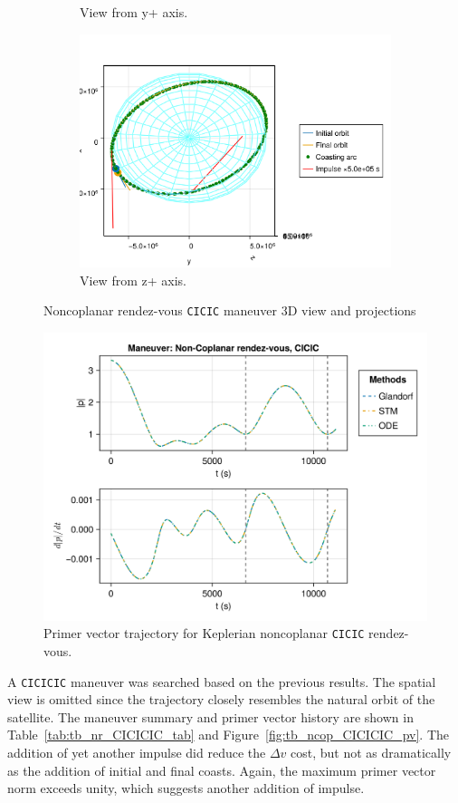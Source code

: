\begin{figure}[htbp]
\begin{subfigure}{0.49\linewidth}
        \caption{View from y+ axis.}
    \end{subfigure}
    \begin{subfigure}{0.49\linewidth}
        \includegraphics[width=0.8\linewidth]{../results/two_body/ipv_noncop/CICIC_z+.png}
        \caption{View from z+ axis.}
    \end{subfigure}
    \caption{Noncoplanar rendez-vous \texttt{CICIC} maneuver 3D view and projections}
    \label{fig:tb_ncop_CICIC_figs}
\end{figure}

\begin{figure}[htbp]
    \centering
    \includegraphics[width=0.7\linewidth]{../results/two_body/ipv_noncop/CICIC_primer_vector.png}
    \caption{Primer vector trajectory for Keplerian noncoplanar \texttt{CICIC} rendez-vous.}
    \label{fig:tb_ncop_CICIC_pv}
\end{figure}
\FloatBarrier
A \texttt{CICICIC} maneuver was searched based on the previous results. The spatial view is omitted since the trajectory closely resembles the natural orbit of the satellite. The maneuver summary and primer vector history are shown in Table~\ref{tab:tb_nr_CICICIC_tab} and Figure~\ref{fig:tb_ncop_CICICIC_pv}. The addition of yet another impulse did reduce the \(\Delta v\) cost, but not as dramatically as the addition of initial and final coasts. Again, the maximum primer vector norm exceeds unity, which suggests another addition of impulse.

